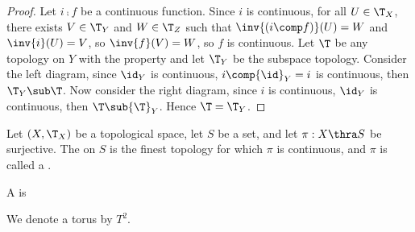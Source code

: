 \documentclass[10pt]{article}
\begin{document}
\begin{center}
    \hspace{2.5cm}
\end{center}
\begin{proof}
    Let $i\comp f$ be a continuous function. Since $i$ is continuous, for all $U\in{\T}_{X}$, there exists $V\in{\T}_{Y}$ and $W\in{\T}_{Z}$ such that $\inv{(i\comp f)}(U)=W$ and $\inv{i}(U)=V$, so $\inv{f}(V)=W$, so $f$ is continuous. Let $\T$ be any topology on $Y$ with the property and let ${\T}_{Y}$ be the subspace topology. Consider the left diagram, since ${\id}_{Y}$ is continuous, $i\comp{\id}_{Y}=i$ is continuous, then ${\T}_{Y}\sub\T$. Now consider the right diagram, since $i$ is continuous, ${\id}_{Y}$ is continuous, then $\T\sub{\T}_{Y}$. Hence $\T={\T}_{Y}$.
\end{proof}
\begin{definition}
    Let $(X,{\T}_{X})$ be a topological space, let $S$ be a set, and let $\pi:X\thra S$ be surjective. The  on $S$ is the finest topology for which $\pi$ is continuous, and $\pi$ is called a .
\end{definition}
\begin{example}
    A  is 

    We denote a torus by ${T}^{2}$.
\end{example}


\newpage
\end{document}

